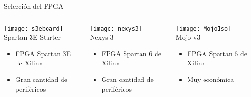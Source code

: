 \begin{frame}{Selección del FPGA}
	\begin{columns}
		\begin{column}{.28\textwidth}
			\centering
			\texttt{[image: s3eboard]}\\
			\centering
			Spartan-3E Starter\\
			\begin{itemize}
				\item FPGA Spartan 3E de Xilinx
				\item Gran cantidad de periféricos
			\end{itemize}
		\end{column}
		\begin{column}{.28\textwidth}
			\centering
			\texttt{[image: nexys3]}\\
			\centering
			Nexys 3\\
			\begin{itemize}
				\item FPGA Spartan 6 de Xilinx
				\item Gran cantidad de periféricos
			\end{itemize}
		\end{column}
		\begin{column}{.28\textwidth}
			\centering
			\texttt{[image: MojoIso]}\\
			\centering
			\alert<2>{Mojo v3\\}
			\begin{itemize}
				\item FPGA Spartan 6 de Xilinx
				\item Muy económica
			\end{itemize}
		\end{column}
	\end{columns}
\end{frame}

